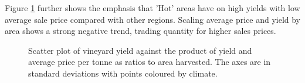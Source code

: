 \documentclass[review,12pt,authoryear]{elsarticle}
\begin{document}
\begin{linenumbers}
Figure \ref{fig:yield_vs_value_area} further shows the emphasis that 'Hot' areas have on high yields with low average sale price compared with other regions. Scaling average price and yield by area shows a strong negative trend, trading quantity for higher sales prices.
\par
\begin{figure}
    \caption{Scatter plot of vineyard yield against the product of yield and average price per tonne as ratios to area harvested. The axes are in standard deviations with points coloured by climate.}\label{fig:yield_vs_value_area}
\end{figure}


\end{linenumbers}
\end{document}
